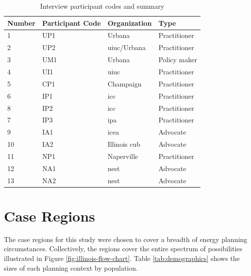 \begin{table}[ht!]
    \centering
    \caption{Interview participant codes and summary}
    \label{tab:interviewees}
    \begin{tabular}{llll}
        \toprule
        Number & Participant Code & Organization & Type \\
        \midrule
        1& UP1 &Urbana& Practitioner\\ %
        2& UP2 &\ac{uiuc}/Urbana& Practitioner\\ %
        3& UM1 &Urbana & Policy maker\\ %
        4& UI1 & \ac{uiuc} & Practitioner\\ %
        5& CP1 & Champaign & Practitioner\\ %
        6& IP1 & \ac{icc} & Practitioner\\ %
        8& IP2 & \ac{icc} & Practitioner\\ %
        7& IP3 & \ac{ipa} & Practitioner\\ %
        9& IA1 &\ac{icea}& Advocate\\ %
        10& IA2 &Illinois \ac{cub} & Advocate\\ %
        11& NP1 & Naperville & Practitioner\\ %
        12& NA1 &\acs{nest}&Advocate\\ %
        13& NA2 &\acs{nest}&Advocate\\ %
        \bottomrule
    \end{tabular}
\end{table}


\section{Case Regions}
\label{section:cases}

The case regions for this study were chosen to cover a breadth of energy
planning circumstances. Collectively, the regions cover the entire spectrum of
possibilities illustrated in Figure \ref{fig:illinois-flow-chart}. Table
\ref{tab:demographics} shows the sizes of each planning context by population.

